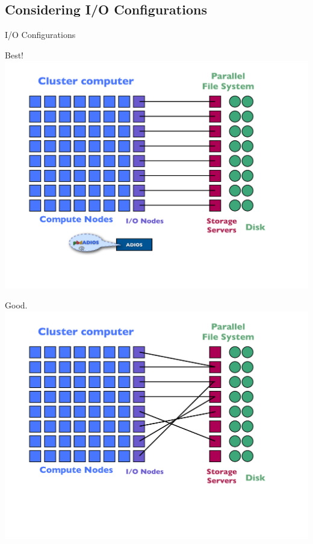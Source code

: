\subsection{Considering I/O Configurations}
\makesubcontentsslidessec

\begin{frame}{I/O Configurations}
\vspace{-1em}
  \begin{minipage}{0.32\textwidth}
    \begin{block}{Best!}
      \includegraphics[trim=0 120 30 40,clip,width=1\textwidth]{../common/pics/hardware/ParallelHardware20.pdf}
    \end{block}
  \end{minipage}\hspace{1ex}
  \begin{minipage}{0.32\textwidth}
    \begin{block}{Good.}
      \includegraphics[trim=0 120 30 40,clip,width=1\textwidth]{../common/pics/hardware/ParallelHardware19.pdf}

\end{block}
\end{minipage}
\end{frame}
